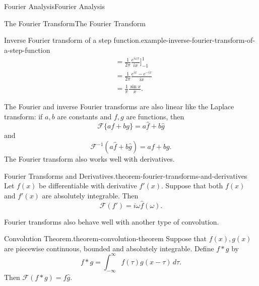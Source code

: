 \documentclass[10pt,]{book}
\numberwithin{equation}{section}
\begin{document}
\begin{chapterptx}{Fourier Analysis}{}{Fourier Analysis}{}{}
\begin{sectionptx}{The Fourier Transform}{}{The Fourier Transform}{}{}
\begin{example}{Inverse Fourier transform of a step function.}{example-inverse-fourier-transform-of-a-step-function}
\begin{align*}
& = \frac{1}{2\pi}\frac{e^{i\omega x}}{ix}\Big]_{-1}^{1} \\
& = \frac{1}{2\pi}\frac{e^{ix}-e^{-ix}}{ix} \\
& = \frac{1}{\pi}\frac{\sin x}{x}. 
\end{align*}
%
\end{example}
\hypertarget{p-429}{}%
The Fourier and inverse Fourier transforms are also linear like the Laplace transform: if \(a,b\) are constants and \(f,g\) are functions, then%
\begin{equation*}
\mathcal{F}\{af+bg\} = a\hat{f}+b\hat{g}
\end{equation*}
and%
\begin{equation*}
\mathcal{F}^{-1}(a\hat{f}+b\hat{g}) = af + bg.
\end{equation*}
The Fourier transform also works well with derivatives.%
\begin{theorem}{Fourier Transforms and Derivatives.}{}{theorem-fourier-transforms-and-derivatives}%
\hypertarget{p-430}{}%
Let \(f(x)\) be differentiable with derivative \(f'(x)\). Suppose that both \(f(x)\) and \(f'(x)\) are absolutely integrable. Then%
\begin{equation*}
\mathcal{F}(f') = i\omega\hat{f}(\omega).
\end{equation*}
%
\end{theorem}
\hypertarget{p-431}{}%
Fourier transforms also behave well with another type of convolution.%
\begin{theorem}{Convolution Theorem.}{}{theorem-convolution-theorem}%
\hypertarget{p-432}{}%
Suppose that \(f(x),g(x)\) are piecewise continuous, bounded and absolutely integrable. Define \(f\ast g\) by%
\begin{equation*}
f\ast g = \int_{-\infty}^{\infty}f(\tau)g(x-\tau)\,d\tau.
\end{equation*}
Then \(\mathcal{F}(f\ast g) = \hat{f}\hat{g}.\)%
\end{theorem}
\end{sectionptx}
\end{chapterptx}
%
%
\typeout{************************************************}
\typeout{************************************************}
%
\end{document}
